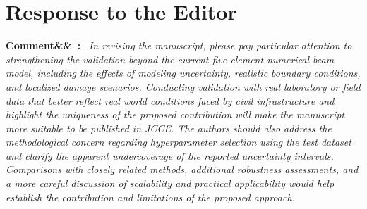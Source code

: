 \documentclass[11pt]{article}
\newenvironment{rcomment}[1]{\par\bigskip\noindent\textbf{Comment\ifx&#1&\else\ #1\fi:}\ \itshape}{\par}
\begin{document}
\section{Response to the Editor}

\begin{rcomment}{}
In revising the manuscript, please pay particular attention to strengthening the validation beyond the current
five-element numerical beam model, including the effects of modeling uncertainty, realistic boundary conditions, and
localized damage scenarios. Conducting validation with real laboratory or field data that better reflect real world
conditions faced by civil infrastructure and highlight the uniqueness of the proposed contribution will make the
manuscript more suitable to be published in JCCE. The authors should also address the methodological concern regarding
hyperparameter selection using the test dataset and clarify the apparent undercoverage of the reported uncertainty
intervals. Comparisons with closely related methods, additional robustness assessments, and a more careful discussion of
scalability and practical applicability would help establish the contribution and limitations of the proposed approach.
\end{rcomment}
\end{document}
